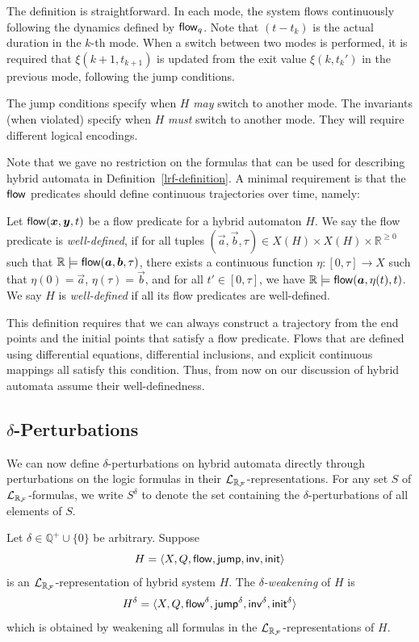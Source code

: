 \documentclass[10pt,envcountsect]{llncs}
\begin{document}
The definition is straightforward. In each mode, the system flows continuously following the dynamics defined by $\mathsf{flow}_q$. Note that $(t-t_k)$ is the actual duration in the $k$-th mode. When a switch between two modes is performed, it is required that $\xi(k+1, t_{k+1})$ is updated from the exit value $\xi(k, t_k')$ in the previous mode, following the jump conditions.
\begin{remark} The jump conditions specify when $H$ {\em may}  switch to another mode. The invariants (when violated) specify when $H$ {\em must} switch to another mode. They will require different logical encodings.
\end{remark}
Note that we gave no restriction on the formulas that can be used for describing hybrid automata in Definition~\ref{lrf-definition}. A minimal requirement is that the $\mathsf{flow}$ predicates should define continuous trajectories over time, namely:
\begin{definition}
Let $\flow(\vec x, \vec y, t)$ be a flow predicate for a hybrid automaton $H$. We say the flow predicate is {\em well-defined}, if for all tuples $(\vec a,\vec b, \tau)\in X(H)\times X(H)\times \mathbb{R}^{\geq 0}$ such that $\mathbb{R}\models\flow(\vec a,\vec b, \tau)$, there exists a continuous function $\eta:[0,\tau]\rightarrow X$ such that $\eta(0) = \vec a$, $\eta(\tau) = \vec b$, and for all $t'\in [0,\tau]$, we have $\mathbb{R}\models\flow(\vec a, \eta(t), t)$. We say $H$ is {\em well-defined} if all its flow predicates are well-defined.
\end{definition}
This definition requires that we can always construct a trajectory from the end points and the initial points that satisfy a flow predicate. Flows that are defined using differential equations, differential inclusions, and explicit continuous mappings all satisfy this condition. Thus, from now on our discussion of hybrid automata assume their well-definedness. 
\subsection{$\delta$-Perturbations}
We can now define $\delta$-perturbations on hybrid automata directly through perturbations on the logic formulas in their $\mathcal{L}_{\mathbb{R}_{\mathcal{F}}}$-representations. For any set $S$ of $\mathcal{L}_{\mathbb{R}_{\mathcal{F}}}$-formulas, we write $S^{\delta}$ to denote the set containing the $\delta$-perturbations of all elements of $S$.
\begin{definition} Let $\delta\in\mathbb{Q}^+\cup\{0\}$ be arbitrary. Suppose
$$H = \langle X, Q, \mathsf{flow}, \mathsf{jump}, \mathsf{inv}, \mathsf{init}\rangle$$
is an $\mathcal{L}_{\mathbb{R}_{\mathcal{F}}}$-representation of hybrid system $H$. The {\em $\delta$-weakening} of $H$ is
$$H^{\delta} = \langle X, Q, \mathsf{flow}^{\delta}, \mathsf{jump}^{\delta}, \mathsf{inv}^{\delta}, \mathsf{init}^{\delta}\rangle$$
which is obtained by weakening all formulas in the $\mathcal{L}_{\mathbb{R}_{\mathcal{F}}}$-representations of $H$.
\end{definition}
\end{document}
